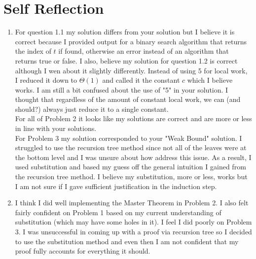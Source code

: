 \documentclass[11pt]{article}
\theoremstyle{nonumberplain}
\begin{document}
\section*{Self Reflection}


\begin{enumerate}
\item For question 1.1 my solution differs from your solution but I believe it is correct because I provided output for a binary search algorithm that returns the index of $t$ if found, otherwise an error instead of an algorithm that returns true or false. I also, believe my solution for question 1.2 is correct although I wen about it slightly differently. Instead of using 5 for local work, I reduced it down to $\Theta(1)$ and called it the constant $c$ which I believe works. I am still a bit confused about the use of "5" in your solution. I thought that regardless of the amount of constant local work, we can (and should?) always just reduce it to a single constant. \\
For all of Problem 2 it looks like my solutions are correct and are more or less in line with your solutions. \\
For Problem 3 my solution corresponded to your "Weak Bound" solution. I struggled to use the recursion tree method since not all of the leaves were at the bottom level and I was unsure about how address this issue. As a result, I used substitution and based my guess off the general intuition I gained from the recursion tree method. I believe my substitution, more or less, works but I am not sure if I gave sufficient justification in the induction step. 
\item I think I did well implementing the Master Theorem in Problem 2. I also felt fairly confident on Problem 1 based on my current understanding of substitution (which may have some holes in it). I feel I did poorly on Problem 3. I was unsuccessful in coming up with a proof via recursion tree so I decided to use the substitution method and even then I am not confident that my proof fully accounts for everything it should. 

\end{enumerate}
\end{document}
